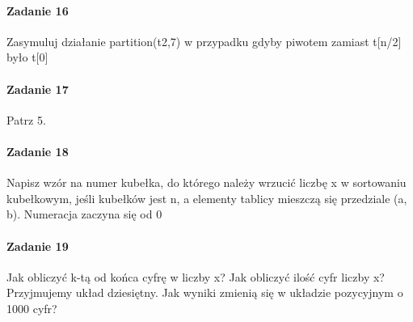 \documentclass[18pt]{extarticle}
\begin{document}
\paragraph{Zadanie 16} Zasymuluj działanie partition(t2,7) w przypadku gdyby piwotem zamiast t[n/2] było t[0]

\paragraph{Zadanie 17} Patrz 5.

\paragraph{Zadanie 18} Napisz wzór na numer kubełka, do którego należy wrzucić liczbę x w sortowaniu kubełkowym, jeśli kubełków jest n, a elementy tablicy mieszczą się przedziale (a, b). Numeracja zaczyna się od 0

\paragraph{Zadanie 19} Jak obliczyć k-tą od końca cyfrę w liczby x? Jak obliczyć ilość cyfr liczby x? Przyjmujemy układ dziesiętny. Jak wyniki zmienią się w układzie pozycyjnym o 1000 cyfr?
\end{document}
